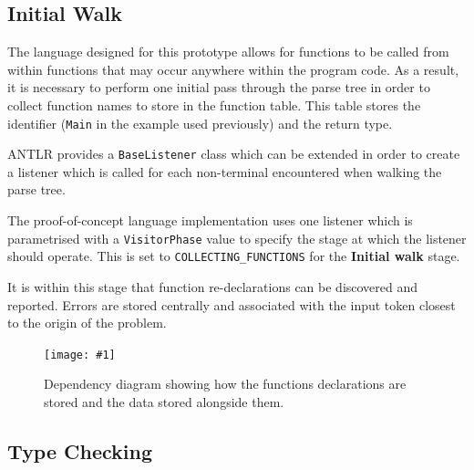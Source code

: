 \documentclass[a4paper]{article}
\newcommand{\widthboxedfigure}[3]{\begin{MyMdframed}\begin{figure}[H]
            \begin{center}\vspace{2em}\texttt{[image: \#1]}\end{center}
            \caption{#2}
\end{figure}\end{MyMdframed}}
\begin{document}
    \subsection*{Initial Walk}
    
    \hfill{}

    The language designed for this prototype allows for functions to be called from within functions that may occur anywhere within the program code. As a result, it is necessary to perform one initial pass through the parse tree in order to collect function names to store in the function table. This table stores the identifier (\texttt{Main} in the example used previously) and the return type.
    
    ANTLR provides a \texttt{BaseListener} class which can be extended in order to create a listener which is called for each non-terminal encountered when walking the parse tree.
    
    The proof-of-concept language implementation uses one listener which is parametrised with a \texttt{VisitorPhase} value to specify the stage at which the listener should operate. This is set to \texttt{COLLECTING\_FUNCTIONS} for the \textbf{Initial walk} stage.
    
    It is within this stage that function re-declarations can be discovered and reported. Errors are stored centrally and associated with the input token closest to the origin of the problem.
    
    \widthboxedfigure{FunctionTable.png}{Dependency diagram showing how the functions declarations are stored and the data stored alongside them.}{0.5}
    
    \subsection*{Type Checking}
    
\end{document}
